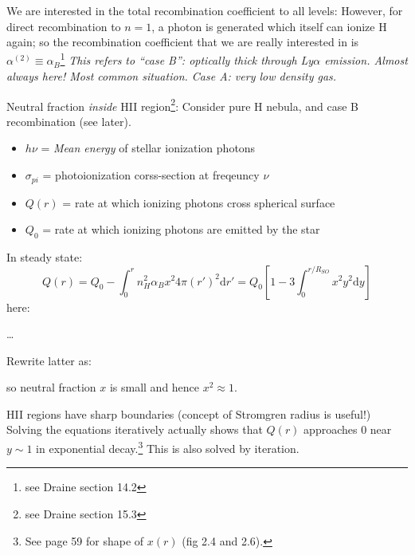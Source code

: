 \documentclass[11pt]{article}
\newcommand{\mar}[1]{\hspace{0pt}\marginpar{-\textcolor{black}{#1}-}}
\newcommand{\mynotes}[1]{{\fontfamily{cmss}\selectfont \textit{#1}}}
\begin{document}
We are interested in the total recombination coefficient to all levels:
However, for direct recombination
to $ n=1 $, a photon is generated which itself can ionize H again; so the
recombination coefficient that we are really interested in is
$\alpha^{(2)} \equiv \alpha_{B}$\footnote{see Draine section 14.2}
\mynotes{This refers to ``case B'': optically thick through Ly$\alpha$
emission. Almost always here! Most common situation. Case A: very low
density gas.}

\mar{56}Neutral fraction \emph{inside} HII region\footnote{see Draine
section 15.3}: Consider pure H nebula, and case B recombination (see
later).
\begin{itemize}
    \item $h\nu$ = \emph{Mean energy} of stellar ionization photons
    \item $\sigma_{pi}$ = photoionization corss-section at freqeuncy $\nu$
    \item $Q(r)$ = rate at which ionizing photons cross spherical surface
    \item $Q_{0}$ = rate at which ionizing photons are emitted by the star
\end{itemize}
In steady state:
\[
    Q(r)
    = Q_{0} - \int_{0}^{r}{
        n_{H}^{2} \alpha_{B} x^{2} 4\pi(r')^{2} \mathrm{d}r'}
    = Q_{0} \left[ 1 - 3\int_{0}^{r/R_{SO}}{
        x^{2}y^{2} \mathrm{d}y} \right]
    \]
here:

\ldots

\mar{57}Rewrite latter as:

so neutral fraction $x$ is small and hence $x^{2} \approx 1$.

HII regions have sharp boundaries (concept of Stromgren radius is useful!)
Solving the equations iteratively actually shows that $Q(r)$ approaches 0
near $ y \sim 1 $ in exponential decay.\footnote{
    See page 59 for shape of $x(r)$ (fig 2.4 and 2.6).}
This is also solved by iteration.
\end{document}
